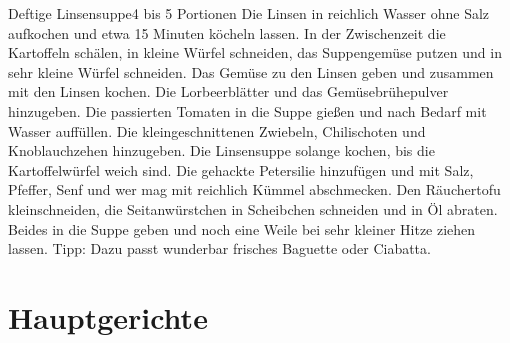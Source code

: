 \documentclass[a4paper,10pt]{article}
\begin{document}
    \begin{recipe}{Deftige Linsensuppe}{4 bis 5 Portionen}{}
        Die Linsen in reichlich Wasser ohne Salz aufkochen und etwa 15 Minuten köcheln lassen.
        In der Zwischenzeit die Kartoffeln schälen, in kleine Würfel schneiden, das Suppengemüse putzen 
        und in sehr kleine Würfel schneiden. Das Gemüse zu den Linsen geben und zusammen mit den Linsen kochen.
        Die Lorbeerblätter und das Gemüsebrühepulver hinzugeben. Die passierten Tomaten in die Suppe gießen
        und nach Bedarf mit Wasser auffüllen.
        Die kleingeschnittenen Zwiebeln, Chilischoten und Knoblauchzehen hinzugeben.
        Die Linsensuppe solange kochen, bis die Kartoffelwürfel weich sind. 
        Die gehackte Petersilie hinzufügen und mit Salz, Pfeffer, Senf und wer mag mit reichlich Kümmel abschmecken.
        Den Räuchertofu kleinschneiden, die Seitanwürstchen in Scheibchen schneiden und in Öl abraten. 
        Beides in die Suppe geben und noch eine Weile bei sehr kleiner Hitze ziehen lassen. 
        \freeform Tipp: Dazu passt wunderbar frisches Baguette oder Ciabatta.
    \end{recipe}
    
    \newpage
    
    
    \section{Hauptgerichte}
    
\end{document}
